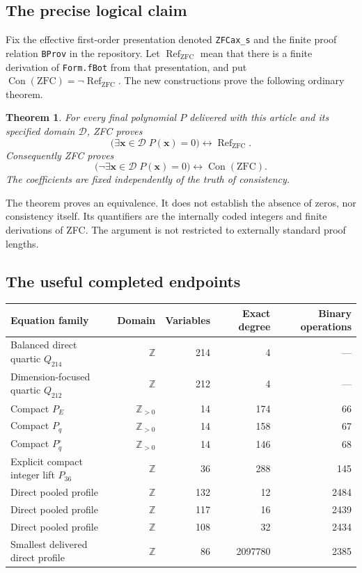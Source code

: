 \documentclass[11pt]{article}
\newtheorem{theorem}{Theorem}[section]
\newcommand{\Z}{\mathbb Z}
\newcommand{\Con}{\operatorname{Con}}
\newcommand{\Refut}{\operatorname{Ref}}
\begin{document}
\subsection{The precise logical claim}

Fix the effective first-order presentation denoted \texttt{ZFCax\_s}
and the finite proof relation \texttt{BProv} in the repository.
Let $\Refut_{\mathrm{ZFC}}$ mean that there is a finite derivation of
\texttt{Form.fBot} from that presentation, and put
$\Con(\mathrm{ZFC})=\neg\Refut_{\mathrm{ZFC}}$.
The new constructions prove the following ordinary theorem.

\begin{theorem}\label{thm:main}
For every final polynomial $P$ delivered with this article and its
specified domain $\mathcal D$, ZFC proves
\[
 \bigl(\exists\mathbf x\in\mathcal D\;P(\mathbf x)=0\bigr)
 \longleftrightarrow \Refut_{\mathrm{ZFC}}.
\]
Consequently ZFC proves
\[
 \boxed{\bigl(\neg\exists\mathbf x\in\mathcal D\;P(\mathbf x)=0\bigr)
 \longleftrightarrow \Con(\mathrm{ZFC}).}
\]
The coefficients are fixed independently of the truth of consistency.
\end{theorem}

The theorem proves an equivalence. It does not establish the absence of
zeros, nor consistency itself. Its quantifiers are the internally coded
integers and finite derivations of ZFC. The argument is not restricted to
externally standard proof lengths.

\subsection{The useful completed endpoints}

\begin{center}
\small
\begin{tabular}{lrrrr}
\toprule
Equation family & Domain & Variables & Exact degree & Binary operations\\
\midrule
Balanced direct quartic $Q_{214}$ & $\Z$ &214&4&---\\
Dimension-focused quartic $Q_{212}$ & $\Z$ &212&4&---\\
Compact $P_E$ & $\Z_{>0}$ &14&174&66\\
Compact $P_q$ & $\Z_{>0}$ &14&158&67\\
Compact $P_q^\circ$ & $\Z_{>0}$ &14&146&68\\
Explicit compact integer lift $P_{36}$ & $\Z$ &36&288&145\\
Direct pooled profile & $\Z$ &132&12&2484\\
Direct pooled profile & $\Z$ &117&16&2439\\
Direct pooled profile & $\Z$ &108&32&2434\\
Smallest delivered direct profile & $\Z$ &86&2097780&2385\\
\bottomrule
\end{tabular}
\end{center}
\end{document}
